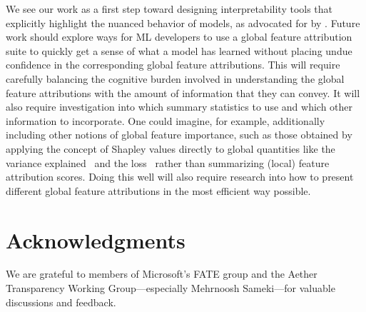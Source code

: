 \documentclass[11pt,dvipdfmx]{article}
\begin{document}
We see our work as a first step toward designing interpretability
tools that explicitly highlight the nuanced behavior of models, as
advocated for by \citet{InterpretingInterpretability}. Future work
should explore ways for ML developers to use a global feature
attribution suite to quickly get a sense of what a model has learned
without placing undue confidence in the corresponding global feature
attributions. This will require carefully balancing the cognitive
burden involved in understanding the global feature attributions with
the amount of information that they can convey. It will also require
investigation into which summary statistics to use and which other
information to incorporate. One could imagine, for example,
additionally including other notions of global feature importance,
such as those obtained by applying the concept of Shapley values
directly to global quantities like the variance explained~\citep{OP17}
and the loss~\citep{CLL20} rather than summarizing (local) feature
attribution scores. Doing this well will also require research into
how to present different global feature attributions in the most
efficient way possible.




\section*{Acknowledgments}
We are grateful to members of Microsoft's FATE group and the
  Aether Transparency Working Group---especially Mehrnoosh
  Sameki---for valuable discussions and feedback.
\end{document}
